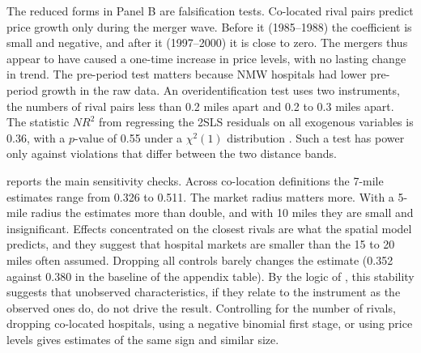  The reduced forms in Panel B are falsification tests. Co-located rival
pairs predict price growth only during the merger wave. Before it (1985--1988) the coefficient is small and
negative, and after it (1997--2000) it is close to zero. The mergers thus appear to have caused a one-time increase
in price levels, with no lasting change in trend. The pre-period test matters because NMW hospitals had lower
pre-period growth in the raw data. An overidentification test uses two instruments, the numbers of rival pairs less
than 0.2 miles apart and 0.2 to 0.3 miles apart. The statistic $N R^2$ from regressing the 2SLS residuals on all
exogenous variables is 0.36, with a $p$-value of 0.55 under a $\chi^2(1)$ distribution \citep{Hausman1983}. Such a
test has power only against violations that differ between the two distance bands.

  reports the main sensitivity checks. Across co-location definitions
the 7-mile estimates range from 0.326 to 0.511. The market radius matters more. With a 5-mile radius the estimates
more than double, and with 10 miles they are small and insignificant. Effects concentrated on the closest rivals are
what the spatial model predicts, and they suggest that hospital markets are smaller than the 15 to 20 miles often
assumed. Dropping all controls barely changes the estimate (0.352 against 0.380 in the baseline of the appendix
table). By the logic of \citet{AltonjiElderTaber2005}, this stability suggests that unobserved characteristics,
if they relate to the instrument as the observed ones do, do not drive the result. Controlling for the number of
rivals, dropping co-located hospitals, using a negative binomial first stage, or using price levels gives estimates
of the same sign and similar size.

